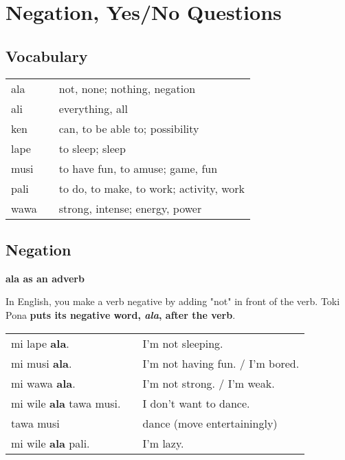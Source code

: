 \section{Negation, Yes/No Questions}
\subsection*{Vocabulary}
\begin{supertabular}{p{5,5cm}|ll}
ala && not, none; nothing, negation \\
ali && everything, all \\
ken && can, to be able to; possibility \\ 
lape && to sleep; sleep \\
musi && to have fun, to amuse; game, fun \\
pali && to do, to make, to work; activity, work \\
wawa && strong, intense; energy, power \\
\end{supertabular}  
%
\subsection*{Negation}
%
\textbf{ala as an adverb}

In English, you make a verb negative by adding "not" in front of the verb.
Toki Pona \textbf{puts its negative word, \textit{ala}, after the verb}. 

\begin{supertabular}{p{5,5cm}|ll}
mi lape \textbf{ala}. && I'm not sleeping. \\ 
mi musi \textbf{ala}. && I'm not having fun. / I'm bored. \\
mi wawa \textbf{ala}. && I'm not strong. / I'm weak. \\
mi wile \textbf{ala} tawa musi. && I don't want to dance. \\
tawa musi && dance (move entertainingly) \\
mi wile \textbf{ala} pali. && I'm lazy. \\
\end{supertabular} 

